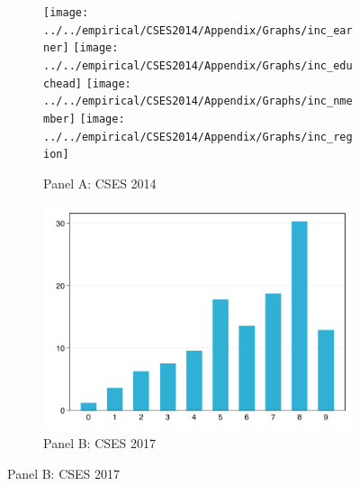 \documentclass[11pt,letterpaper]{article}
\begin{document}
\begin{figure}[H]
	\caption{Median household income by type}
	\label{fig:app21}
	\begin{subfigure}[b]{0.33\linewidth}
		\caption*{Panel A: CSES 2014} \vspace{-.5em}
		\label{fig:3a}
		\texttt{[image: ../../empirical/CSES2014/Appendix/Graphs/inc\_earner]} 
		\vspace{-2.5em}
		\newline {}
		\texttt{[image: ../../empirical/CSES2014/Appendix/Graphs/inc\_educhead]} 
		\vspace{-2.5em}
		\newline {}
		\texttt{[image: ../../empirical/CSES2014/Appendix/Graphs/inc\_nmember]} 
		\vspace{-2.5em}
		\newline {}
		\texttt{[image: ../../empirical/CSES2014/Appendix/Graphs/inc\_region]} 
		\vspace{-2.5em}
		\newline {}
	\end{subfigure}%
	\hfil
	\begin{subfigure}[b]{0.33\linewidth}
		\caption*{Panel B: CSES 2017} \vspace{-.5em}
		\label{fig:3b}
		\includegraphics[width=1\linewidth]{../../empirical/CSES2017/Appendix/Graphs/inc_earner} 
		\vspace{-2.5em}
		\newline {}

\end{subfigure}
\end{figure}
\end{document}

